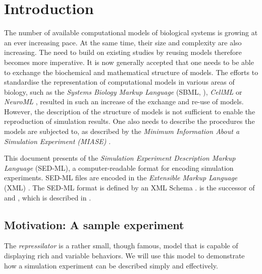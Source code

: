 \chapter{Introduction}

The number of available computational models of biological systems is growing at an ever increasing pace. 
At the same time, their size and complexity are also increasing. The need to build on existing studies by reusing models therefore becomes more imperative. 
It is now generally accepted that one needs to be able to exchange the biochemical and mathematical structure of models. 
The efforts to standardise the representation of computational models in various areas of biology, such as the \emph{Systems Biology Markup Language} (SBML, \citep{Hucka:2003}), \emph{CellML} \citep{cuellar:2003} or \emph{NeuroML} \citep{Goddard:2001}, resulted in such an increase of the exchange and re-use of models. 
However, the description of the structure of models is not sufficient to enable the reproduction of simulation results.  
One also needs to describe the procedures the models are subjected to, as described by the \emph{Minimum Information About a Simulation Experiment (MIASE)} \citep{Waltemath:2011}. 

This document presents  \currentLV of the \emph{Simulation Experiment Description Markup Language} (SED-ML), a computer-readable format for encoding simulation experiments. 
SED-ML files are encoded in the \emph{Extensible Markup Language} (XML) \citep{Bray:2006}. The SED-ML format is defined by an XML Schema \citep{Fallside:2001}. 
\currentLV is the successor of \previousLV and \LoneVone, which is described in \citep{WAB+11}.

\section{Motivation: A sample experiment}
\label{motivation:example}

The \emph{repressilator} is a rather small, though famous, model that is capable of displaying rich and variable behaviors. We will use this model to demonstrate how a simulation experiment can be described simply and effectively. 


